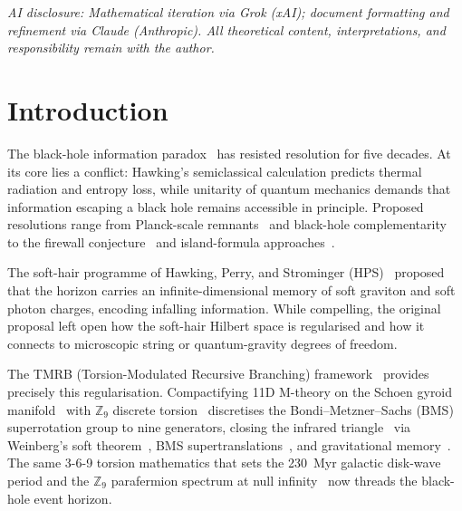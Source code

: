 \documentclass[11pt,a4paper]{article}
\begin{document}
{\small\textit{AI disclosure: Mathematical iteration via Grok (xAI);
document formatting and refinement via Claude (Anthropic).
All theoretical content, interpretations, and responsibility remain with the author.}}

\vspace{8pt}

\section{Introduction}
\label{sec:intro}

The black-hole information paradox~\cite{Hawking1975} has resisted resolution for
five decades.  At its core lies a conflict: Hawking's semiclassical calculation
predicts thermal radiation and entropy loss, while unitarity of quantum mechanics
demands that information escaping a black hole remains accessible in principle.
Proposed resolutions range from Planck-scale remnants~\cite{AharonovEtal1987} and
black-hole complementarity~\cite{Susskind1993} to the firewall
conjecture~\cite{AMPS2013} and island-formula approaches~\cite{Penington2020}.

The soft-hair programme of Hawking, Perry, and Strominger
(HPS)~\cite{HawkingPerryStrominger2016} proposed that the horizon carries an
infinite-dimensional memory of soft graviton and soft photon charges, encoding
infalling information.  While compelling, the original proposal left open how the
soft-hair Hilbert space is regularised and how it connects to microscopic string or
quantum-gravity degrees of freedom.

The TMRB (Torsion-Modulated Recursive Branching) framework~\cite{BresslerUF2026,BresslerPrismatic2026}
provides precisely this regularisation.  Compactifying 11D M-theory on the Schoen
gyroid manifold~\cite{Schoen1970} with $\mathbb{Z}_9$ discrete torsion~\cite{BresslerBGL2026}
discretises the Bondi--Metzner--Sachs (BMS) superrotation group to nine generators,
closing the infrared
triangle~\cite{BresslerCH2026} via Weinberg's soft theorem~\cite{Weinberg1965},
BMS supertranslations~\cite{BMS1962,Strominger2014}, and gravitational
memory~\cite{Christodoulou1991,BresslerGP2026}.  The same 3-6-9 torsion
mathematics that sets the 230~Myr galactic disk-wave period and the $\mathbb{Z}_9$
parafermion spectrum at null infinity~\cite{GepnerQiu1987,ZamoFateev1987} now
threads the black-hole event horizon.
\end{document}
